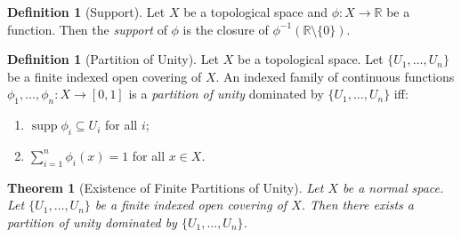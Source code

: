 \documentclass{report}
\newtheorem{thm}[lm]{Theorem}
\theoremstyle{definition}
\newtheorem{df}[lm]{Definition}
\newcommand{\inv}[1]{\ensuremath{{#1}^{-1}}}
\newcommand{\supp}{\ensuremath{\operatorname{supp}}}
\begin{document}
  \begin{df}[Support]
   Let $X$ be a topological space and $\phi : X \rightarrow \mathbb{R}$ be a
   function. Then the \emph{support} of $\phi$ is the closure of
   $\inv{\phi}(\mathbb{R} \setminus \{ 0 \})$.
 \end{df}

  \begin{df}[Partition of Unity]
   Let $X$ be a topological space. Let $\{ U_1, \ldots, U_n \}$ be a finite
indexed open covering of $X$. An indexed family of continuous functions
$\phi_1, \ldots, \phi_n : X \rightarrow [0,1]$ is a \emph{partition of unity}
dominated by $\{ U_1, \ldots, U_n \}$ iff:
\begin{enumerate}
 \item $\supp \phi_i \subseteq U_i$ for all $i$;
 \item $\sum_{i=1}^n \phi_i(x) = 1$ for all $x \in X$.
\end{enumerate}
 \end{df}

  \begin{thm}[Existence of Finite Partitions of Unity]
    \label{thm:topology:manifolds:partition}
   Let $X$ be a normal space.
   Let $\{ U_1, \ldots, U_n \}$ be a finite indexed open covering of $X$. Then
   there exists a partition of unity dominated by $\{ U_1, \ldots, U_n \}$.
 \end{thm}
\end{document}
